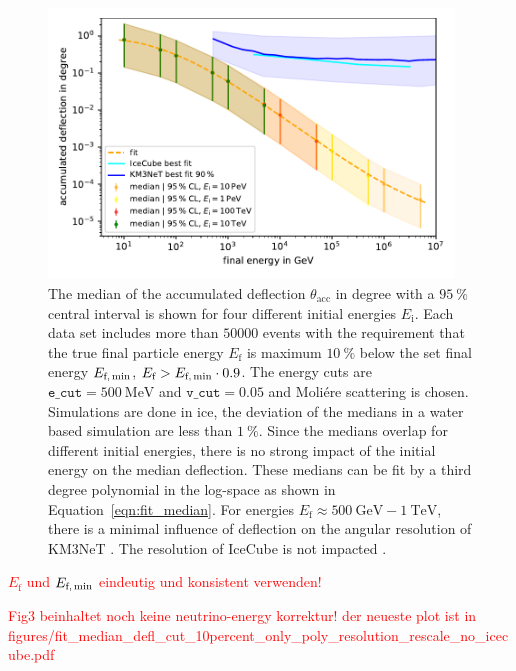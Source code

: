 \begin{figure}
    \centering 
    \includegraphics[width=0.96\textwidth]{figures/fit_median_defl_cut_10percent_only_poly.pdf}
    \caption{The median of the accumulated deflection $\theta_{\text{acc}}$ in degree 
    with a $\SI{95}{\percent}$ 
    central interval is shown for four different initial energies $E_{\text{i}}$. 
    Each data set includes more than $\num{50000}$ events with the requirement 
    that the true final particle energy $E_{\text{f}}$ is maximum 
    $\SI{10}{\percent}$ below the set final energy $E_{\text{f,\,min}}$,   
    $E_{\text{f}} > E_{\text{f,\,min}} \cdot 0.9$. The energy cuts are $\texttt{e\_cut} = \SI{500}{\mega\electronvolt}$ and $\texttt{v\_cut} = 0.05$ and 
    Moliére scattering is chosen. Simulations are done in ice, the deviation 
    of the medians in a water based simulation are less than $\SI{1}{\percent}$.
    Since the medians overlap for different initial energies, there is no 
    strong impact of the initial energy on the median deflection. These 
    medians can be fit by a third degree polynomial in the log-space as 
    shown in Equation~\ref{eqn:fit_median}. For energies 
    $E_{\text{f}} \approx \SI{500}{\giga\electronvolt} - \SI{1}{\tera\electronvolt}$, there is a minimal influence of deflection on the angular resolution of 
    KM3NeT \cite{KM3NeT_Resolution2016}. The resolution of IceCube is not 
    impacted \cite{IceCube_Resolution2021}.}
    \label{fig:fit_median}
\end{figure}

\textcolor{red}{$E_{\text{f}}$ und $E_{\text{f,\,min}}$ eindeutig und konsistent verwenden!}

\textcolor{red}{Fig3 beinhaltet noch keine neutrino-energy korrektur! der neueste plot ist in figures/fit\_median\_defl\_cut\_10percent\_only\_poly\_resolution\_rescale\_no\_icecube.pdf}

